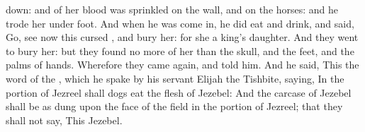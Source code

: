{down: and
{} of her
blood was
sprinkled on the
wall, and on the
horses: and he trode her under
foot.
And when he was come
in, he did
eat and
drink, and
said,
Go, see now this
cursed
{}, and
bury her: for she
{} a
king’s
daughter.
And they
went to
bury her: but they
found no more of her
than the
skull, and the
feet, and the
palms of
{}
hands.
Wherefore they came
again, and
told him. And he
said, This
{} the
word of the
{}, which he
spake
by his
servant
Elijah the
Tishbite,
saying, In the
portion of
Jezreel shall
dogs
eat the
flesh of
Jezebel:
And the
carcase of
Jezebel shall be as
dung upon the
face of the
field in the
portion of
Jezreel;
{} that they shall not
say, This
{}
Jezebel.

}
